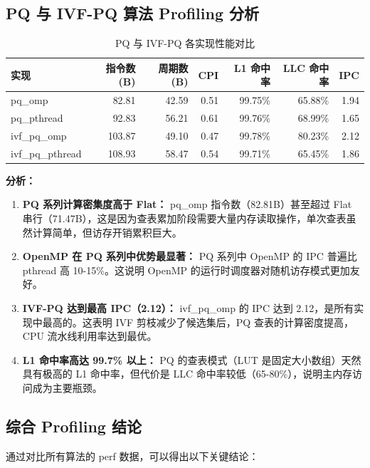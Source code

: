 \documentclass[a4paper]{article}
\begin{document}
\subsection{PQ 与 IVF-PQ 算法 Profiling 分析}

\begin{table}[htbp]
\centering
\caption{PQ 与 IVF-PQ 各实现性能对比}
\begin{tabular}{lrrrrrr}
\toprule
实现 & 指令数 (B) & 周期数 (B) & CPI & L1 命中率 & LLC 命中率 & IPC \\
\midrule
pq\_omp          &  82.81 & 42.59 & 0.51 & 99.75\% & 65.88\% & 1.94 \\
pq\_pthread      &  92.83 & 56.21 & 0.61 & 99.76\% & 68.99\% & 1.65 \\
ivf\_pq\_omp     & 103.87 & 49.10 & 0.47 & 99.78\% & 80.23\% & 2.12 \\
ivf\_pq\_pthread & 108.93 & 58.47 & 0.54 & 99.71\% & 65.45\% & 1.86 \\
\bottomrule
\end{tabular}
\end{table}

\textbf{分析：}

\begin{enumerate}
\item \textbf{PQ 系列计算密集度高于 Flat：} pq\_omp 指令数（82.81B）甚至超过 Flat 串行（71.47B），这是因为查表累加阶段需要大量内存读取操作，单次查表虽然计算简单，但访存开销累积巨大。

\item \textbf{OpenMP 在 PQ 系列中优势最显著：} PQ 系列中 OpenMP 的 IPC 普遍比 pthread 高 10-15\%。这说明 OpenMP 的运行时调度器对随机访存模式更加友好。

\item \textbf{IVF-PQ 达到最高 IPC（2.12）：} ivf\_pq\_omp 的 IPC 达到 2.12，是所有实现中最高的。这表明 IVF 剪枝减少了候选集后，PQ 查表的计算密度提高，CPU 流水线利用率达到最优。

\item \textbf{L1 命中率高达 99.7\% 以上：} PQ 的查表模式（LUT 是固定大小数组）天然具有极高的 L1 命中率，但代价是 LLC 命中率较低（65-80\%），说明主内存访问成为主要瓶颈。
\end{enumerate}

\subsection{综合 Profiling 结论}

通过对比所有算法的 perf 数据，可以得出以下关键结论：
\end{document}
